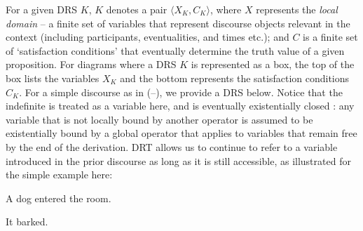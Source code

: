 For a given DRS $ K $, $ K $ denotes a pair $ \langle X_K,C_K\rangle $, where $ X $ represents the \textit{local domain} -- a finite set of variables that represent discourse objects relevant in the context (including participants, eventualities, and times etc.); and $ C $ is a finite set of `satisfaction conditions' that eventually determine the truth value of a given proposition. For diagrams where a DRS $ K $ is represented as a box, the top of the box lists the variables $ X_K $ and the bottom represents the satisfaction conditions $ C_K $. For a simple discourse as in (\nextx--\anextx), we provide a DRS below. Notice that the indefinite is treated as a variable here, and is eventually existentially closed \citep{Heim}: any variable that is not locally bound by another operator is assumed to be existentially bound by a global operator that applies to variables that remain free by the end of the derivation. %
DRT allows us to continue to refer to a variable introduced in the prior discourse as long as it is still accessible, as illustrated for the simple example here:\\

\begin{minipage}{2.5in}
	
	\pex  A dog entered the room. 
	
	\begin{flushleft}
		\hspace{3em}	
	\end{flushleft}	\xe
\end{minipage}
\begin{minipage}{2in}
	\pex  It barked.
	
	\begin{flushleft}
		\hspace{3em}
		\drs{x}{dog(x)\\entered-room(x)\\barked(x)}
	\end{flushleft}	\xe
	
\end{minipage}
\vspace{1em}

